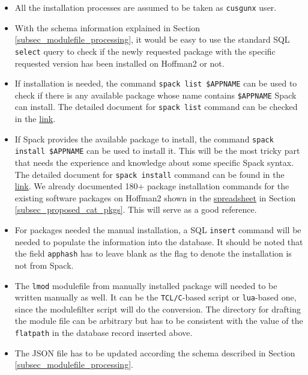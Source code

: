 \documentclass[conference]{IEEEtran}
\begin{document}
\begin{itemize}
    \item All the installation processes are assumed to be taken as \verb|cusgunx| user.
    \item With the schema information explained in Section \ref{subsec_modulefile_processing}, it would be easy to use the standard SQL \verb|select| query to check if the newly requested package with the specific requested version has been installed on Hoffman2 or not.
    \item If installation is needed, the command \verb|spack list $APPNAME| can be used to check if there is any available package whose name contains \verb|$APPNAME| Spack can install. The detailed document for \verb|spack list| command can be checked in the \href{https://spack.readthedocs.io/en/latest/command_index.html#spack-list}{link}.
    \item If Spack provides the available package to install, the command \verb|spack install $APPNAME| can be used to install it. This will be the most tricky part that needs the experience and knowledge about some specific Spack syntax. The detailed document for \verb|spack install| command can be found in the \href{https://spack.readthedocs.io/en/latest/basic_usage.html#cmd-spack-install}{link}. We already documented 180+ package installation commands for the existing software packages on Hoffman2 shown in the \href{https://ucla-my.sharepoint.com/:x:/g/personal/huqy_ad_ucla_edu/ESfMOTn1oidAlnMlAVYbCd8BOlgseFtgmbwszJPsum7AgQ?e=sGbSoJ}{spreadsheet} in Section \ref{subsec_proposed_cat_pkgs}. This will serve as a good reference. 
    \item For packages needed the manual installation, a SQL \verb|insert| command will be needed to populate the information into the database. It should be noted that the field \verb|apphash| has to leave blank as the flag to denote the installation is not from Spack.
    \item The \verb|lmod| modulefile from manually installed package will needed to be written manually as well. It can be the \verb|TCL/C|-based script or \verb|lua|-based one, since the modulefilter script will do the conversion. The directory for drafting the module file can be arbitrary but has to be consistent with the value of the \verb|flatpath| in the database record inserted above.
    \item The JSON file has to be updated according the schema described in Section \ref{subsec_modulefile_processing}. 
\end{itemize}
\end{document}
